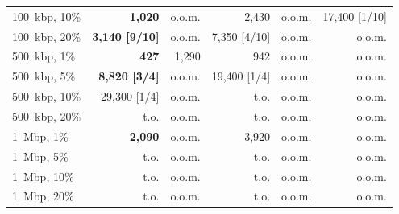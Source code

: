 \documentclass[10pt]{article}
\begin{document}
\begin{table}[t]
{\begin{tabular}{@{}lrrrrr@{}}
100~kbp, 10\% & \textbf{1{,}020} & o.o.m. & 2{,}430 & o.o.m. & 17{,}400 [1/10] \\
100~kbp, 20\% & \textbf{3{,}140 [9/10]} & o.o.m. & 7{,}350 [4/10] & o.o.m. & o.o.m. \\
500~kbp, 1\% & \textbf{427} & 1{,}290 & 942 & o.o.m. & o.o.m. \\
500~kbp, 5\% & \textbf{8{,}820 [3/4]} & o.o.m. & 19{,}400 [1/4] & o.o.m. & o.o.m. \\
500~kbp, 10\% & 29{,}300 [1/4] & o.o.m. & t.o. & o.o.m. & o.o.m. \\
500~kbp, 20\% & t.o. & o.o.m. & t.o. & o.o.m. & o.o.m. \\
1~Mbp, 1\% & \textbf{2{,}090} & o.o.m. & 3{,}920 & o.o.m. & o.o.m. \\
1~Mbp, 5\% & t.o. & o.o.m. & t.o. & o.o.m. & o.o.m. \\
1~Mbp, 10\% & t.o. & o.o.m. & t.o. & o.o.m. & o.o.m. \\
1~Mbp, 20\% & t.o. & o.o.m. & t.o. & o.o.m. & o.o.m. \\
\bottomrule
\end{tabular}}
\end{table}
\end{document}
